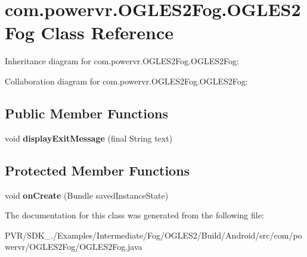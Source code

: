 \hypertarget{classcom_1_1powervr_1_1_o_g_l_e_s2_fog_1_1_o_g_l_e_s2_fog}{\section{com.\+powervr.\+O\+G\+L\+E\+S2\+Fog.\+O\+G\+L\+E\+S2\+Fog Class Reference}
\label{classcom_1_1powervr_1_1_o_g_l_e_s2_fog_1_1_o_g_l_e_s2_fog}
}


Inheritance diagram for com.\+powervr.\+O\+G\+L\+E\+S2\+Fog.\+O\+G\+L\+E\+S2\+Fog\+:


Collaboration diagram for com.\+powervr.\+O\+G\+L\+E\+S2\+Fog.\+O\+G\+L\+E\+S2\+Fog\+:
\subsection*{Public Member Functions}
\begin{DoxyCompactItemize}
\item 
\hypertarget{classcom_1_1powervr_1_1_o_g_l_e_s2_fog_1_1_o_g_l_e_s2_fog_ab278811044ab7a1a58e25bebf5fab2c9}{void {\bfseries display\+Exit\+Message} (final String text)}\label{classcom_1_1powervr_1_1_o_g_l_e_s2_fog_1_1_o_g_l_e_s2_fog_ab278811044ab7a1a58e25bebf5fab2c9}

\end{DoxyCompactItemize}
\subsection*{Protected Member Functions}
\begin{DoxyCompactItemize}
\item 
\hypertarget{classcom_1_1powervr_1_1_o_g_l_e_s2_fog_1_1_o_g_l_e_s2_fog_a4bd1e0098cf3212b812f533f80ca6d92}{void {\bfseries on\+Create} (Bundle saved\+Instance\+State)}\label{classcom_1_1powervr_1_1_o_g_l_e_s2_fog_1_1_o_g_l_e_s2_fog_a4bd1e0098cf3212b812f533f80ca6d92}

\end{DoxyCompactItemize}


The documentation for this class was generated from the following file\+:\begin{DoxyCompactItemize}
\item 
P\+V\+R/\+S\+D\+K\+\_./\+Examples/\+Intermediate/\+Fog/\+O\+G\+L\+E\+S2/\+Build/\+Android/src/com/powervr/\+O\+G\+L\+E\+S2\+Fog/O\+G\+L\+E\+S2\+Fog.\+java\end{DoxyCompactItemize}
